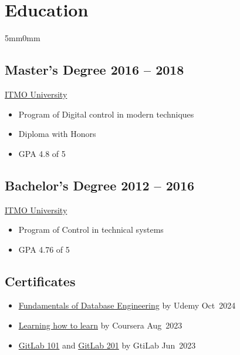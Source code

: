 \documentclass[10pt]{article}
\newcommand{\lmvalue}{5mm}
\newcommand{\rmvalue}{0mm}
\begin{document}
\section*{Education}
\begin{changemargin}{\lmvalue}{\rmvalue}

	\begin{minipage}[t]{0.47\linewidth}
		\subsection*{Master's Degree \hfill {\color{gray}2016 – 2018}}
		\href{https://en.itmo.ru/}{ITMO University}
		\begin{itemize}
			\item Program of Digital control in modern techniques
			\item Diploma with Honors
			\item GPA 4.8 of 5
		\end{itemize}
	\end{minipage}
	\hfill%
	\begin{minipage}[t]{0.48\linewidth}
		\subsection*{Bachelor's Degree \hfill {\color{gray}2012 – 2016}}
		\href{https://en.itmo.ru/}{ITMO University}
		\begin{itemize}
			\item Program of Control in technical systems
			\item GPA 4.76 of 5
		\end{itemize}
	\end{minipage}
	\subsection*{Certificates}
	\begin{itemize}
		\item \href{https://www.udemy.com/certificate/UC-996e9255-2d89-4db2-9f70-e77f060e30b8}{Fundamentals of Database Engineering} by Udemy {\color{gray}Oct~2024}
		\item \href{https://www.coursera.org/account/accomplishments/certificate/JTS4UC77RMRH}{Learning how to learn} by Coursera {\color{gray}Aug~2023}
		\item \href{https://levelup.gitlab.com/c/OQPvtAh7ScyFaSX04Cya0g}{GitLab 101} and \href{https://levelup.gitlab.com/c/rFApBMcWT66ZF-F4IPdlrQ}{GitLab 201} by GtiLab {\color{gray}Jun~2023}
	\end{itemize}
\end{changemargin}
\end{document}
